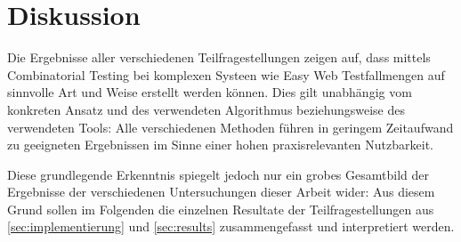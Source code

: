 \chapter{Diskussion}\label{chap:diskussion}

Die Ergebnisse aller verschiedenen Teilfragestellungen zeigen auf, dass mittels Combinatorial Testing bei komplexen Systeen wie Easy Web Testfallmengen auf sinnvolle Art und Weise erstellt werden können. Dies gilt unabhängig vom konkreten Ansatz und des verwendeten Algorithmus beziehungsweise des verwendeten Tools: Alle verschiedenen Methoden führen in geringem Zeitaufwand zu geeigneten Ergebnissen im Sinne einer hohen praxisrelevanten Nutzbarkeit.

Diese grundlegende Erkenntnis spiegelt jedoch nur ein grobes Gesamtbild der Ergebnisse der verschiedenen Untersuchungen dieser Arbeit wider: Aus diesem Grund sollen im Folgenden die einzelnen Resultate der Teilfragestellungen aus \autoref{sec:implementierung} und \autoref{sec:results} zusammengefasst und interpretiert werden.


